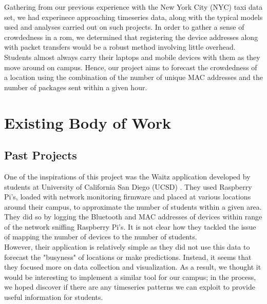 \documentclass[journal, 12pt]{IEEEtran}
\begin{document}
\noindent Gathering from our previous experience with the New York City (NYC) taxi data set, we had experinece approaching timeseries data, along with the typical models used and analyses carried out on such projects. In order to gather a sense of crowdedness in a rom, we determined that registering the device addresses along with packet transfers would be a robust method involving little overhead. Students almost always carry their laptops and mobile devices with them as they move around on campus. Hence, our project aims to forecast the crowdedness of a location using the combination of the number of unique MAC addresses and the number of packages sent within a given hour.


\section{Existing Body of Work}
\subsection{Past Projects}
\noindent One of the inspirations of this project was the Waitz application developed by students at University of California San Diego (UCSD) \cite{waitz}. They used Raspberry Pi's, loaded with network monitoring firmware and placed at various locations around their campus, to approximate the number of students within a given area. They did so by logging the Bluetooth and MAC addresses of devices within range of the network sniffing Raspberry Pi's. It is not clear how they tackled the issue of mapping the number of devices to the number of students.\\


\noindent However, their application is relatively simple as they did not use this data to forecast the "busyness" of locations or make predictions. Instead, it seems that they focused more on data collection and visualization. As a result, we thought it would be interesting to implement a similar tool for our campus; in the process, we hoped discover if there are any timeseries patterns we can exploit to provide useful information for students.
\end{document}
